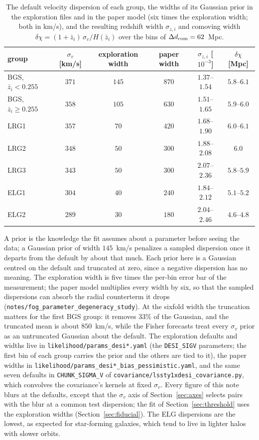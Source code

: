 \documentclass[11pt]{article}
\newcommand{\dcom}{$\Delta d_{\rm com} = 62$~Mpc}
\newcommand{\sv}{\sigma_v}
\newcommand{\us}{\_\allowbreak}
\begin{document}
\begin{table}[ht]
  \centering
  \begin{tabular}{lccccc}
    \hline
    group & $\sv$ [km/s] & exploration width & paper width
      & $\sigma_{z,i}$ [$10^{-3}$] & $\delta\chi$ [Mpc] \\
    \hline
    BGS, $\bar{z}_i < 0.255$ & $371$ & $145$ & $870$ & $1.37$--$1.54$ & $5.8$--$6.1$ \\
    BGS, $\bar{z}_i \ge 0.255$ & $358$ & $105$ & $630$ & $1.51$--$1.65$ & $5.9$--$6.0$ \\
    LRG1 & $357$ & $70$ & $420$ & $1.68$--$1.90$ & $6.0$--$6.1$ \\
    LRG2 & $348$ & $50$ & $300$ & $1.88$--$2.08$ & $6.0$ \\
    LRG3 & $343$ & $50$ & $300$ & $2.07$--$2.36$ & $5.8$--$5.9$ \\
    ELG1 & $304$ & $40$ & $240$ & $1.84$--$2.12$ & $5.1$--$5.2$ \\
    ELG2 & $289$ & $30$ & $180$ & $2.04$--$2.46$ & $4.6$--$4.8$ \\
    \hline
  \end{tabular}
  \caption{The default velocity dispersion of each group, the widths of
    its Gaussian prior in the exploration files and in the paper model
    (six times the exploration width; both in km/s), and the resulting
    redshift width $\sigma_{z,i}$ and comoving width
    $\delta\chi = (1 + \bar{z}_i)\,\sv/H(\bar{z}_i)$ over the bins of
    \dcom{}.}
  \label{tab:sigv}
\end{table}

A prior is the knowledge the fit assumes about a parameter before
seeing the data; a Gaussian prior of width $145$~km/s penalizes a
sampled dispersion once it departs from the default by about that
much.  Each prior here is a Gaussian centred on the default and
truncated at zero, since a negative dispersion has no meaning.
The exploration width is five times the per-bin error bar of the
measurement; the paper model multiplies every width by six, so that
the sampled dispersions can absorb the radial counterterm it drops
(\texttt{notes/fog\us parameter\us degeneracy\us study}).  At the
sixfold width the truncation matters for the first BGS group: it
removes $33\%$ of the Gaussian, and the truncated mean is about
$850$~km/s, while the Fisher forecasts treat every $\sv$ prior as an
untruncated Gaussian about the default.  The exploration defaults and
widths live in \texttt{likelihood/params\us desi*.yaml} (the
\texttt{DESI\us SIGV} parameters; the first bin of each group carries
the prior and the others are tied to it), the paper widths in
\texttt{likelihood/params\us desi*\us bias\us pessimistic.yaml}, and
the same seven defaults in \texttt{CHUNK\us SIGMA\us V} of
\texttt{covariance/lssty1xdesi\us covariance.py}, which convolves the
covariance's kernels at fixed $\sv$.  Every figure of this note blurs
at the defaults, except that the $\sv$ axis of Section~\ref{sec:axes}
selects pairs with the blur at a common test dispersion; the fit of
Section~\ref{sec:threshold} uses the exploration widths
(Section~\ref{sec:fiducial}).  The ELG dispersions
are the lowest, as expected for star-forming galaxies, which tend to
live in lighter halos with slower orbits.
\end{document}
